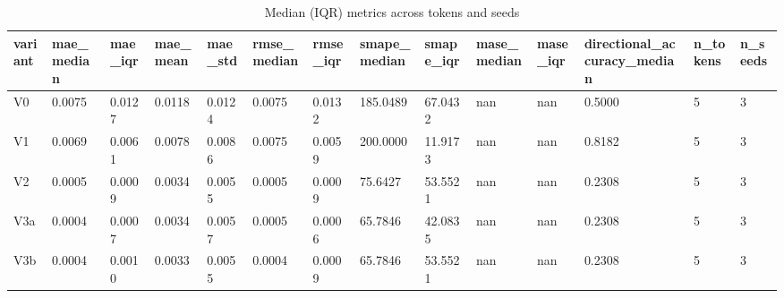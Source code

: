 \begin{table}[htbp]
\centering
\begin{tabular}{llllllllllllll}
\hline
variant & mae_median & mae_iqr & mae_mean & mae_std & rmse_median & rmse_iqr & smape_median & smape_iqr & mase_median & mase_iqr & directional_accuracy_median & n_tokens & n_seeds \\
\hline
V0 & 0.0075 & 0.0127 & 0.0118 & 0.0124 & 0.0075 & 0.0132 & 185.0489 & 67.0432 & nan & nan & 0.5000 & 5 & 3 \\
V1 & 0.0069 & 0.0061 & 0.0078 & 0.0086 & 0.0075 & 0.0059 & 200.0000 & 11.9173 & nan & nan & 0.8182 & 5 & 3 \\
V2 & 0.0005 & 0.0009 & 0.0034 & 0.0055 & 0.0005 & 0.0009 & 75.6427 & 53.5521 & nan & nan & 0.2308 & 5 & 3 \\
V3a & 0.0004 & 0.0007 & 0.0034 & 0.0057 & 0.0005 & 0.0006 & 65.7846 & 42.0835 & nan & nan & 0.2308 & 5 & 3 \\
V3b & 0.0004 & 0.0010 & 0.0033 & 0.0055 & 0.0004 & 0.0009 & 65.7846 & 53.5521 & nan & nan & 0.2308 & 5 & 3 \\
\hline
\end{tabular}
\caption{Median (IQR) metrics across tokens and seeds}
\label{table_ablation}
\end{table}